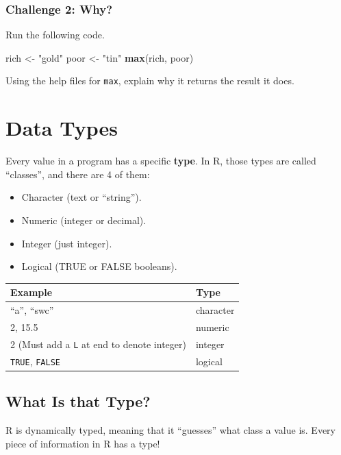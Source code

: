\documentclass[
]{book}
\newenvironment{Shaded}{\begin{snugshade}}{\end{snugshade}}
\newcommand{\KeywordTok}[1]{\textcolor[rgb]{0.13,0.29,0.53}{\textbf{#1}}}
\newcommand{\NormalTok}[1]{#1}
\newcommand{\StringTok}[1]{\textcolor[rgb]{0.31,0.60,0.02}{#1}}
\providecommand{\tightlist}{%
  \setlength{\itemsep}{0pt}\setlength{\parskip}{0pt}}
\begin{document}
\hypertarget{challenge-2-why}{%
\subsubsection*{Challenge 2: Why?}\label{challenge-2-why}}

Run the following code.

\begin{Shaded}
\begin{Highlighting}[]
\NormalTok{rich <-}\StringTok{ "gold"}
\NormalTok{poor <-}\StringTok{ "tin"}
\KeywordTok{max}\NormalTok{(rich, poor)}
\end{Highlighting}
\end{Shaded}

Using the help files for \texttt{max}, explain why it returns the result it does.

\hypertarget{data-types}{%
\section{Data Types}\label{data-types}}

Every value in a program has a specific \textbf{type}. In R, those types are called ``classes'', and there are 4 of them:

\begin{itemize}
\tightlist
\item
  Character (text or ``string'').
\item
  Numeric (integer or decimal).
\item
  Integer (just integer).
\item
  Logical (TRUE or FALSE booleans).
\end{itemize}

\begin{longtable}[]{@{}ll@{}}
\toprule
Example & Type\tabularnewline
\midrule
\endhead
``a'', ``swc'' & character\tabularnewline
2, 15.5 & numeric\tabularnewline
2 (Must add a \texttt{L} at end to denote integer) & integer\tabularnewline
\texttt{TRUE}, \texttt{FALSE} & logical\tabularnewline
\bottomrule
\end{longtable}

\hypertarget{what-is-that-type}{%
\subsection{What Is that Type?}\label{what-is-that-type}}

R is dynamically typed, meaning that it ``guesses'' what class a value is. Every piece of information in R has a type!
\end{document}
